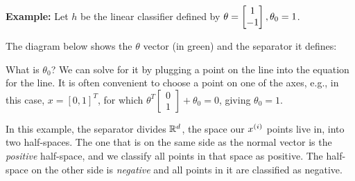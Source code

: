 \begin{examplebox}{\bf Example:}
  Let $h$ be the linear classifier defined by $\theta = \protect\begin{bmatrix} 1 \\ -1 \end{bmatrix}, \theta_0 = 1$.

  \bigskip
  \noindent
  The diagram below shows the $\theta$ vector (in green) and the separator
  it defines:

  \begin{center}

  \end{center}

  What is $\theta_0$?  We can solve for it by plugging a point
  on the line into the equation for the line.  It is often convenient to choose a point on one of the axes, e.g., in this case,
  $x=[0, 1]^T$, for which $\theta^T \left[ \begin{array}{c} 0 \\ 1 \end{array} \right] + \theta_0 = 0$, giving $\theta_0 = 1$.

\end{examplebox}


In this example, the separator divides $\mathbb{R}^d$, the space our $x^{(i)}$ points live
in, into two half-spaces.  The one that is on the same side as the
normal vector is the {\em positive} half-space, and we classify all
points in that space as positive.  The half-space on the other side is
  {\em negative} and all points in it are classified as negative.

